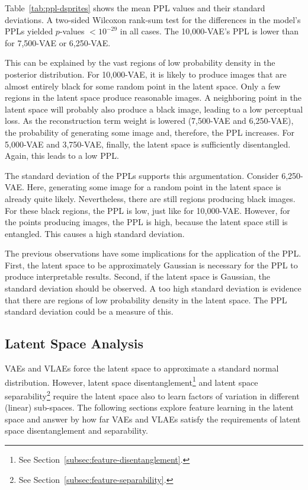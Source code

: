 Table~\ref{tab:ppl-dsprites} shows the mean \ac{PPL} values and their standard deviations.
A two-sided Wilcoxon rank-sum test for the differences in the model's \acp{PPL} yielded $p$-values $< 10^{-29}$ in all cases.
The 10,000-\ac{VAE}'s \ac{PPL} is lower than for 7,500-\ac{VAE} or 6,250-\ac{VAE}.

This can be explained by the vast regions of low probability density in the posterior distribution.
For 10,000-\ac{VAE}, it is likely to produce images that are almost entirely black for some random point in the latent space.
Only a few regions in the latent space produce reasonable images.
A neighboring point in the latent space will probably also produce a black image, leading to a low perceptual loss.
As the reconstruction term weight is lowered (7,500-\ac{VAE} and 6,250-\ac{VAE}), the probability of generating some image and, therefore, the \ac{PPL} increases.
For 5,000-\ac{VAE} and 3,750-\ac{VAE}, finally, the latent space is sufficiently disentangled.
Again, this leads to a low \ac{PPL}.

The standard deviation of the \acp{PPL} supports this argumentation.
Consider 6,250-\ac{VAE}.
Here, generating some image for a random point in the latent space is already quite likely.
Nevertheless, there are still  regions producing black images.
For these black regions, the \ac{PPL} is low, just like for 10,000-\ac{VAE}.
However, for the points producing images, the \ac{PPL} is high, because the latent space still is entangled.
This causes a high standard deviation.

The previous observations have some implications for the application of the \ac{PPL}.
First, the latent space to be approximately Gaussian is necessary for the \ac{PPL} to produce interpretable results.
Second, if the latent space is Gaussian, the standard deviation should be observed.
A too high standard deviation is evidence that there are regions of low probability density in the latent space.
The \ac{PPL} standard deviation could be a measure of this.

\subsection{Latent Space Analysis}\label{subsec:model-generated-samples}

\acp{VAE} and \acp{VLAE} force the latent space to approximate a standard normal distribution.
However, latent space disentanglement\footnote{See Section~\ref{subsec:feature-disentanglement}.} and latent space separability\footnote{See Section~\ref{subsec:feature-separability}.} require the latent space also to learn factors of variation in different (linear) sub-spaces.
The following sections explore feature learning in the latent space and answer by how far \acp{VAE} and \acp{VLAE} satisfy the requirements of latent space disentanglement and separability.

